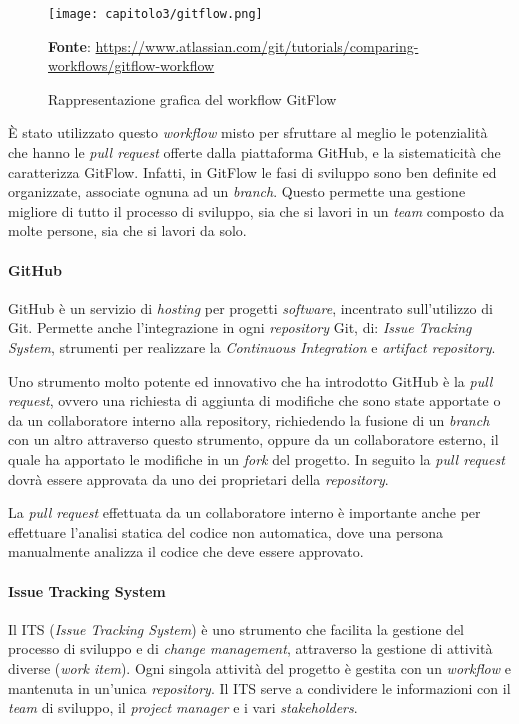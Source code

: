 \begin{figure}[h!]
  \centering
  \texttt{[image: capitolo3/gitflow.png]}
  \caption{Rappresentazione grafica del workflow GitFlow}
  \textbf{Fonte}: \href{https://www.atlassian.com/git/tutorials/comparing-workflows/gitflow-workflow}{https://www.atlassian.com/git/tutorials/comparing-workflows/gitflow-workflow}
\end{figure}

È stato utilizzato questo \textit{workflow} misto per sfruttare al meglio le potenzialità che hanno le \textit{pull request} offerte dalla piattaforma GitHub, e la sistematicità che caratterizza GitFlow. Infatti, in GitFlow le fasi di sviluppo sono ben definite ed organizzate, associate ognuna ad un \textit{branch}. Questo permette una gestione migliore di tutto il processo di sviluppo, sia che si lavori in un \textit{team} composto da molte persone, sia che si lavori da solo.

\paragraph{GitHub}
GitHub è un servizio di \textit{hosting} per progetti \textit{software}, incentrato sull'utilizzo di Git. Permette anche l'integrazione in ogni \textit{repository} Git, di: \textit{Issue Tracking System}, strumenti per realizzare la \textit{Continuous Integration} e \textit{artifact repository}. 

Uno strumento molto potente ed innovativo che ha introdotto GitHub è la \textit{pull request}, ovvero una richiesta di aggiunta di modifiche che sono state apportate o da un collaboratore interno alla repository, richiedendo la fusione di un \textit{branch} con un altro attraverso questo strumento, oppure da un collaboratore esterno, il quale ha apportato le modifiche in un \textit{fork} del progetto. In seguito la \textit{pull request} dovrà essere approvata da uno dei proprietari della \textit{repository}. 

La \textit{pull request} effettuata da un collaboratore interno è importante anche per effettuare l'analisi statica del codice non automatica, dove una persona manualmente analizza il codice che deve essere approvato.

\paragraph{Issue Tracking System}
Il ITS (\textit{Issue Tracking System}) è uno strumento che facilita la gestione del processo di sviluppo e di \textit{change management}, attraverso la gestione di attività diverse (\textit{work item}). Ogni singola attività del progetto è gestita con un \textit{workflow} e mantenuta in un'unica \textit{repository}. Il ITS serve a condividere le informazioni con il \textit{team} di sviluppo, il \textit{project manager} e i vari \textit{stakeholders}. \\

